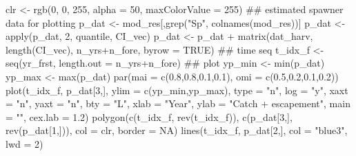 \documentclass[11pt,]{article}
\newenvironment{Shaded}{}{}
\newcommand{\CommentTok}[1]{\textcolor[rgb]{0.00,0.50,0.00}{#1}}
\newcommand{\DataTypeTok}[1]{#1}
\newcommand{\DecValTok}[1]{#1}
\newcommand{\FloatTok}[1]{#1}
\newcommand{\KeywordTok}[1]{\textcolor[rgb]{0.00,0.00,1.00}{#1}}
\newcommand{\NormalTok}[1]{#1}
\newcommand{\OperatorTok}[1]{#1}
\newcommand{\OtherTok}[1]{\textcolor[rgb]{1.00,0.25,0.00}{#1}}
\newcommand{\StringTok}[1]{\textcolor[rgb]{0.00,0.50,0.50}{#1}}
\begin{document}
\begin{Shaded}
\begin{Highlighting}[]
\NormalTok{clr <-}\StringTok{ }\KeywordTok{rgb}\NormalTok{(}\DecValTok{0}\NormalTok{, }\DecValTok{0}\NormalTok{, }\DecValTok{255}\NormalTok{, }\DataTypeTok{alpha =} \DecValTok{50}\NormalTok{, }\DataTypeTok{maxColorValue =} \DecValTok{255}\NormalTok{)}
\CommentTok{## estimated spawner data for plotting}
\NormalTok{p_dat <-}\StringTok{ }\NormalTok{mod_res[,}\KeywordTok{grep}\NormalTok{(}\StringTok{"Sp"}\NormalTok{, }\KeywordTok{colnames}\NormalTok{(mod_res))]}
\NormalTok{p_dat <-}\StringTok{ }\KeywordTok{apply}\NormalTok{(p_dat, }\DecValTok{2}\NormalTok{, quantile, CI_vec)}
\NormalTok{p_dat <-}\StringTok{ }\NormalTok{p_dat }\OperatorTok{+}\StringTok{ }\KeywordTok{matrix}\NormalTok{(dat_harv, }\KeywordTok{length}\NormalTok{(CI_vec), n_yrs}\OperatorTok{+}\NormalTok{n_fore, }\DataTypeTok{byrow =} \OtherTok{TRUE}\NormalTok{)}
\CommentTok{## time seq}
\NormalTok{t_idx_f <-}\StringTok{ }\KeywordTok{seq}\NormalTok{(yr_frst, }\DataTypeTok{length.out =}\NormalTok{ n_yrs}\OperatorTok{+}\NormalTok{n_fore)}
\CommentTok{## plot}
\NormalTok{yp_min <-}\StringTok{ }\KeywordTok{min}\NormalTok{(p_dat)}
\NormalTok{yp_max <-}\StringTok{ }\KeywordTok{max}\NormalTok{(p_dat)}
\KeywordTok{par}\NormalTok{(}\DataTypeTok{mai =} \KeywordTok{c}\NormalTok{(}\FloatTok{0.8}\NormalTok{,}\FloatTok{0.8}\NormalTok{,}\FloatTok{0.1}\NormalTok{,}\FloatTok{0.1}\NormalTok{), }\DataTypeTok{omi =} \KeywordTok{c}\NormalTok{(}\FloatTok{0.5}\NormalTok{,}\FloatTok{0.2}\NormalTok{,}\FloatTok{0.1}\NormalTok{,}\FloatTok{0.2}\NormalTok{))}
\KeywordTok{plot}\NormalTok{(t_idx_f, p_dat[}\DecValTok{3}\NormalTok{,], }\DataTypeTok{ylim =} \KeywordTok{c}\NormalTok{(yp_min,yp_max), }\DataTypeTok{type =} \StringTok{"n"}\NormalTok{,}
     \DataTypeTok{log =} \StringTok{"y"}\NormalTok{, }\DataTypeTok{xaxt =} \StringTok{"n"}\NormalTok{, }\DataTypeTok{yaxt =} \StringTok{"n"}\NormalTok{, }\DataTypeTok{bty =} \StringTok{"L"}\NormalTok{,}
     \DataTypeTok{xlab =} \StringTok{"Year"}\NormalTok{, }\DataTypeTok{ylab =} \StringTok{"Catch + escapement"}\NormalTok{, }\DataTypeTok{main =} \StringTok{""}\NormalTok{, }\DataTypeTok{cex.lab =} \FloatTok{1.2}\NormalTok{)}
\KeywordTok{polygon}\NormalTok{(}\KeywordTok{c}\NormalTok{(t_idx_f, }\KeywordTok{rev}\NormalTok{(t_idx_f)), }\KeywordTok{c}\NormalTok{(p_dat[}\DecValTok{3}\NormalTok{,], }\KeywordTok{rev}\NormalTok{(p_dat[}\DecValTok{1}\NormalTok{,])),}
        \DataTypeTok{col =}\NormalTok{ clr, }\DataTypeTok{border =} \OtherTok{NA}\NormalTok{)}
\KeywordTok{lines}\NormalTok{(t_idx_f, p_dat[}\DecValTok{2}\NormalTok{,], }\DataTypeTok{col =} \StringTok{"blue3"}\NormalTok{, }\DataTypeTok{lwd =} \DecValTok{2}\NormalTok{)}

\end{Highlighting}
\end{Shaded}
\end{document}
